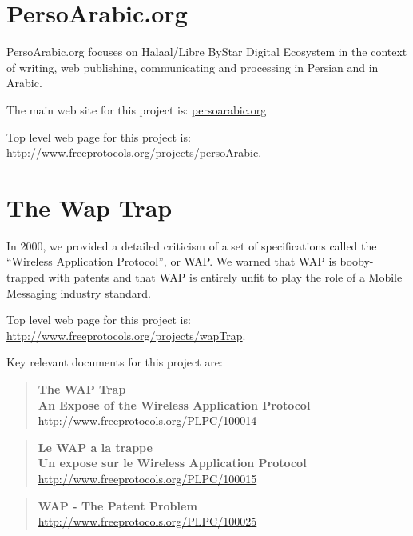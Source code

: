 \section{PersoArabic.org}

PersoArabic.org focuses on Halaal/Libre ByStar Digital Ecosystem in the context of
writing, web publishing, communicating and processing in Persian and in Arabic.

The main web site for this project is:
\href{http://www.persoarabic.org}{persoarabic.org}

Top level web page for this project is: \href{http://www.freeprotocols.org/projects/persoArabic}{http://www.freeprotocols.org/projects/persoArabic}.

\section{The Wap Trap}

In 2000, we provided a detailed criticism of a set of specifications called the ``Wireless
Application Protocol'', or WAP. We warned that WAP is booby-trapped with patents and that
WAP is entirely unfit to play the role of a Mobile Messaging industry standard. 

Top level web page for this project is: \href{http://www.freeprotocols.org/projects/wapTrap}{http://www.freeprotocols.org/projects/wapTrap}.

Key relevant documents for this project are:

\begin{quote}
  \textbf{The WAP Trap}\\
  \textbf{An Expose of the Wireless Application Protocol}\\
  \href{http://www.freeprotocols.org/PLPC/100014}{http://www.freeprotocols.org/PLPC/100014}
\end{quote}


\begin{quote}
  \textbf{Le WAP a la trappe}\\
  \textbf{Un expose sur le Wireless Application Protocol}\\
  \href{http://www.freeprotocols.org/PLPC/100015}{http://www.freeprotocols.org/PLPC/100015}
\end{quote}


\begin{quote}
  \textbf{WAP - The Patent Problem}\\
  \href{http://www.freeprotocols.org/PLPC/100025}{http://www.freeprotocols.org/PLPC/100025}
\end{quote}

